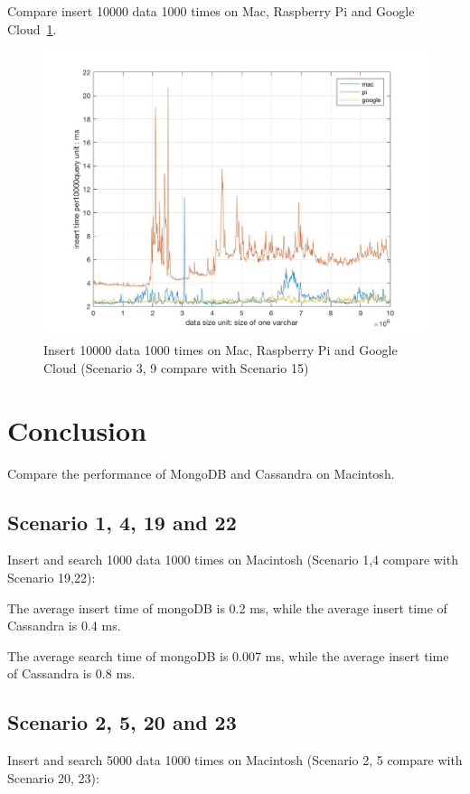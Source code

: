 Compare insert 10000 data 1000 times on Mac, Raspberry Pi and Google Cloud~\ref{f:fly}.

\begin{figure}[!ht]
  \centering\includegraphics[width=\columnwidth]
  {images/insert_comp_10000_three.jpg}
  \caption{Insert 10000 data 1000 times on  Mac, Raspberry Pi and Google Cloud
  (Scenario 3, 9 compare with Scenario 15)}\label{f:fly}
\end{figure}


\section{Conclusion}
Compare the performance of MongoDB and Cassandra on Macintosh. 

\subsection{Scenario 1, 4, 19 and 22}
Insert and search 1000 data 1000 times on Macintosh 
(Scenario 1,4 compare with Scenario 19,22):

The average insert time of mongoDB is 0.2 ms, while the average insert time of 
Cassandra is 0.4 ms.

The average search time of mongoDB is 0.007 ms, while the average insert time of 
Cassandra is 0.8 ms.

\subsection{Scenario 2, 5, 20 and 23}
Insert and search 5000 data 1000 times on Macintosh 
(Scenario 2, 5 compare with Scenario 20, 23):


